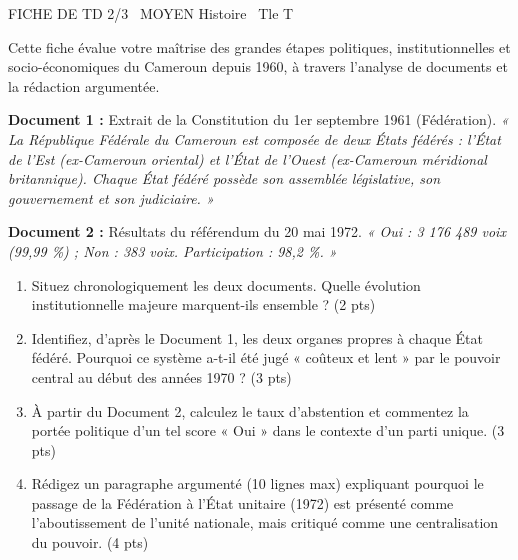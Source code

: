 \documentclass[11pt]{article}
\begin{document}
\begin{tcolorbox}[enhanced,colback=popink,colframe=popink,arc=10pt,boxrule=0pt,left=12pt,right=12pt,top=9pt,bottom=9pt]
{\color{white}\popxbold\small FICHE DE TD 2/3 \textbullet\ MOYEN \hfill Histoire \textbullet\ Tle T\par}
\end{tcolorbox}
\vspace{4pt}
Cette fiche évalue votre maîtrise des grandes étapes politiques, institutionnelles et socio-économiques du Cameroun depuis 1960, à travers l'analyse de documents et la rédaction argumentée.

\begin{exercice}
\label{exo:reunification}
\textbf{Document 1 :} Extrait de la Constitution du 1er septembre 1961 (Fédération). \textit{« La République Fédérale du Cameroun est composée de deux États fédérés : l'État de l'Est (ex-Cameroun oriental) et l'État de l'Ouest (ex-Cameroun méridional britannique). Chaque État fédéré possède son assemblée législative, son gouvernement et son judiciaire. »}

\textbf{Document 2 :} Résultats du référendum du 20 mai 1972. \textit{« Oui : 3 176 489 voix (99,99 \%) ; Non : 383 voix. Participation : 98,2 \%. »}

\begin{enumerate}
    \item Situez chronologiquement les deux documents. Quelle évolution institutionnelle majeure marquent-ils ensemble ? (2 pts)
    \item Identifiez, d'après le Document 1, les deux organes propres à chaque État fédéré. Pourquoi ce système a-t-il été jugé « coûteux et lent » par le pouvoir central au début des années 1970 ? (3 pts)
    \item À partir du Document 2, calculez le taux d'abstention et commentez la portée politique d'un tel score « Oui » dans le contexte d'un parti unique. (3 pts)
    \item Rédigez un paragraphe argumenté (10 lignes max) expliquant pourquoi le passage de la Fédération à l'État unitaire (1972) est présenté comme l'aboutissement de l'unité nationale, mais critiqué comme une centralisation du pouvoir. (4 pts)
\end{enumerate}
\end{exercice}
\end{document}
